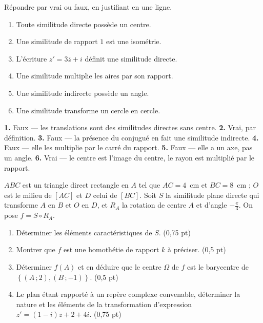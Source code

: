 \begin{jemeteste}
Répondre par vrai ou faux, en justifiant en une ligne.

\begin{enumerate}[label=\textbf{\arabic*.}, leftmargin=*, itemsep=0.28em]
  \item Toute similitude directe possède un centre.
  \item Une similitude de rapport $1$ est une isométrie.
  \item L'écriture $z' = 3\overline z+i$ définit une similitude directe.
  \item Une similitude multiplie les aires par son rapport.
  \item Une similitude indirecte possède un angle.
  \item Une similitude transforme un cercle en cercle.
\end{enumerate}
\end{jemeteste}

\begin{corrige}[je me teste]
\textbf{1.} Faux — les translations sont des similitudes directes sans
centre.
\textbf{2.} Vrai, par définition.
\textbf{3.} Faux — la présence du conjugué en fait une similitude indirecte.
\textbf{4.} Faux — elle les multiplie par le carré du rapport.
\textbf{5.} Faux — elle a un axe, pas un angle.
\textbf{6.} Vrai — le centre est l'image du centre, le rayon est multiplié
par le rapport.
\end{corrige}

\begin{commeaubac}
$ABC$ est un triangle direct rectangle en $A$ tel que $AC = 4$~cm et
$BC = 8$~cm ; $O$ est le milieu de $[AC]$ et $D$ celui de $[BC]$. Soit $S$ la
similitude plane directe qui transforme $A$ en $B$ et $O$ en $D$, et $R_{A}$
la rotation de centre $A$ et d'angle $-\frac{\pi}{3}$. On pose
$f = S \circ R_{A}$.

\begin{enumerate}[label=\textbf{\arabic*.}, leftmargin=*, itemsep=0.25em]
  \item Déterminer les éléments caractéristiques de $S$.
        \hfill\textup{(0,75 pt)}
  \item Montrer que $f$ est une homothétie de rapport $k$ à préciser.
        \hfill\textup{(0,5 pt)}
  \item Déterminer $f(A)$ et en déduire que le centre $\Omega$ de $f$ est le
        barycentre de $\left\{(A\,;2),(B\,;-1)\right\}$.
        \hfill\textup{(0,5 pt)}
  \item Le plan étant rapporté à un repère complexe convenable, déterminer la
        nature et les éléments de la transformation d'expression
        $z' = (1-i)\overline z+2+4i$. \hfill\textup{(0,75 pt)}
\end{enumerate}
\end{commeaubac}

